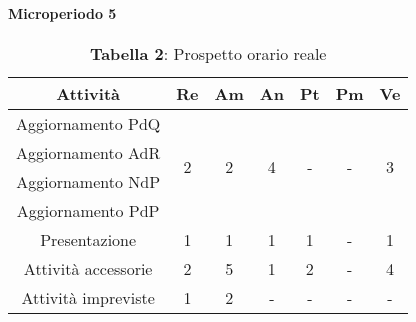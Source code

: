 \paragraph{Microperiodo 5}
\begin{table}[H]
	\centering
	\begin{tabular}{|c|c|c|c|c|c|c|}
		\hline
		\rowcolor{lighter-grayer}
		\textbf{Attività}   & \textbf{Re}        & \textbf{Am}        & \textbf{An}        & \textbf{Pt}        & \textbf{Pm}        & \textbf{Ve}        \\ \hline
		Aggiornamento PdQ   & \multirow{4}{*}{2} & \multirow{4}{*}{2} & \multirow{4}{*}{4} & \multirow{4}{*}{-} & \multirow{4}{*}{-} & \multirow{4}{*}{3} \\ \cline{1-1}
		Aggiornamento AdR   &                    &                    &                    &                    &                    &                    \\ \cline{1-1}
		Aggiornamento NdP   &                    &                    &                    &                    &                    &                    \\ \cline{1-1}
		Aggiornamento PdP   &                    &                    &                    &                    &                    &                    \\ \hline
		Presentazione       & 1                  & 1                  & 1                  & 1                  & -                  & 1                  \\ \hline
		Attività accessorie & 2                  & 5                  & 1                  & 2                  & -                  & 4                  \\ \hline
		Attività impreviste & 1                  & 2                  & -                  & -                  & -                  & -                  \\ \hline
	\end{tabular}
\caption*{\textbf{Tabella 2}: Prospetto orario reale\\}
\end{table}

